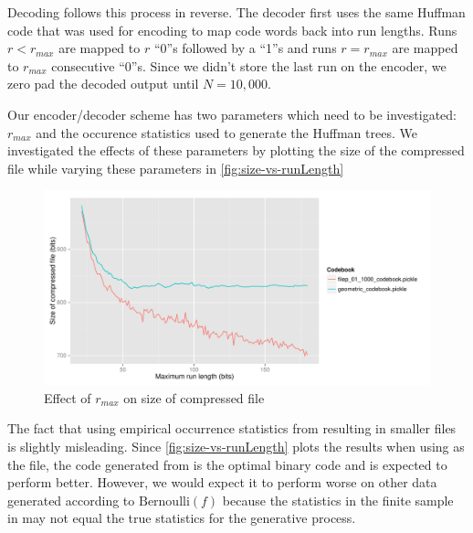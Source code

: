 \documentclass[a4paper,oneside,reqno]{hmcpset}
\begin{document}
\begin{solution}
  Decoding follows this process in reverse. The decoder first uses the same Huffman code
  that was used for encoding to map code words back into run lengths. Runs $r < r_{max}$
  are mapped to $r$ ``0''s followed by a ``1''s and runs $r = r_{max}$ are mapped to
  $r_{max}$ consecutive ``0''s. Since we didn't store the last run on the encoder,
  we zero pad the decoded output until $N=10,000$.

  Our encoder/decoder scheme has two parameters which need to be investigated:
  $r_{max}$ and the occurence statistics used to generate the Huffman trees.
  We investigated the effects of these parameters by plotting the size of the
  compressed  file while varying these parameters in
  \autoref{fig:size-vs-runLength}

  \begin{figure}[ht!]
    \begin{center}
      \includegraphics[scale=0.6]{Figures/size-vs-runLength.pdf}
    \end{center}
    \caption{Effect of $r_{max}$ on size of compressed file}
    \label{fig:size-vs-runLength}
  \end{figure}

  The fact that using empirical occurrence statistics from
   resulting in smaller files is slightly misleading.
  Since \autoref{fig:size-vs-runLength} plots the results when using
   as the file, the code generated from
   is the optimal binary code and is expected to
  perform better. However, we would expect it to perform worse on other data
  generated according to $\text{Bernoulli}(f)$ because the statistics in the
  finite sample in  may not equal the true statistics
  for the generative process. %


\end{solution}
\end{document}
